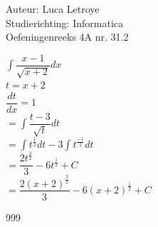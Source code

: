 \documentclass[a4paper]{article}
\begin{document}
  
\noindent \large Auteur: Luca Letroye \\
\noindent \large Studierichting: Informatica\\
\noindent \large Oefeningenreeks 4A nr. 31.2

\medskip
\normalsize

$\displaystyle\int \dfrac{x-1}{\sqrt{x+2}}dx $\\

$t = x+2$\\

$\dfrac{dt}{dx} = 1$\\

$ = \displaystyle\int \dfrac{t-3}{\sqrt{t}}dt  $\\

$ = \displaystyle\int t^{\tfrac{1}{2}}dt -3\displaystyle\int t^{\tfrac{-1}{2}}dt$\\

$ = \dfrac{2t^{\tfrac{3}{2}}}{3} - 6t^{\tfrac{1}{2}} +C$\\

$ = \dfrac{2(x+2)^{\tfrac{3}{2}}}{3} - 6(x+2)^{\tfrac{1}{2}} +C$\\


\begin{thebibliography}{999}
\end{thebibliography}
\end{document}
